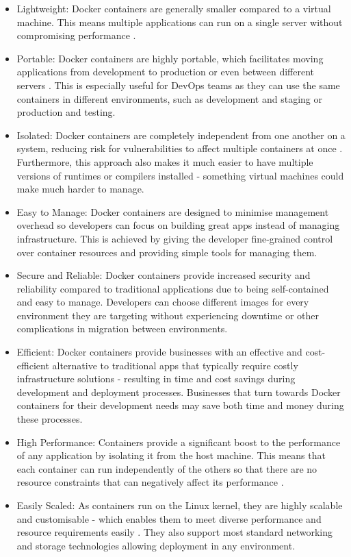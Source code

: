 \documentclass[BIF,Bachelor,nenglish]{twbook}%
\begin{document}
\begin{itemize}
\item Lightweight: Docker containers are generally smaller compared to a virtual machine. This means multiple applications can run on a single server without compromising performance \cite{vmwcovsvm}.

\item Portable: Docker containers are highly portable, which facilitates moving applications from development to production or even between different servers \cite{rad2017} . This is especially useful for DevOps teams as they can use the same containers in different environments, such as development and staging or production and testing.

\item Isolated: Docker containers are completely independent from one another on a system, reducing risk for vulnerabilities to affect multiple containers at once \cite{com2016} . Furthermore, this approach also makes it much easier to have multiple versions of runtimes or compilers installed - something virtual machines could make much harder to manage.

\item Easy to Manage: Docker containers are designed to minimise management overhead so developers can focus on building great apps instead of managing infrastructure. This is achieved by giving the developer fine-grained control over container resources and providing simple tools for managing them.

\item Secure and Reliable: Docker containers provide increased security and reliability compared to traditional applications due to being self-contained and easy to manage. Developers can choose different images for every environment they are targeting without experiencing downtime or other complications in migration between environments.

\item Efficient: Docker containers provide businesses with an effective and cost-efficient alternative to traditional apps that typically require costly infrastructure solutions - resulting in time and cost savings during development and deployment processes. Businesses that turn towards Docker containers for their development needs may save both time and money during these processes.

\item High Performance: Containers provide a significant boost to the performance of any application by isolating it from the host machine. This means that each container can run independently of the others so that there are no resource constraints that can negatively affect its performance \cite{rad2017}.

\item Easily Scaled: As containers run on the Linux kernel, they are highly scalable and customisable - which enables them to meet diverse performance and resource requirements easily \cite{rad2017}. They also support most standard networking and storage technologies allowing deployment in any environment.
\end{itemize}
\end{document}
